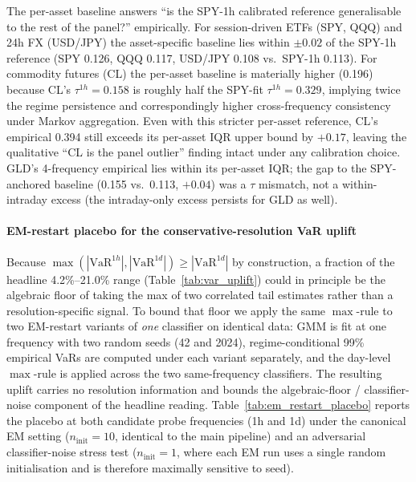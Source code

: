 \documentclass[preprint,12pt,authoryear]{elsarticle}
\begin{document}
\noindent The per-asset baseline answers ``is the SPY-1h calibrated reference generalisable to the rest of the panel?'' empirically. For session-driven ETFs (SPY, QQQ) and 24h FX (USD/JPY) the asset-specific baseline lies within $\pm 0.02$ of the SPY-1h reference (SPY 0.126, QQQ 0.117, USD/JPY 0.108 vs.\ SPY-1h 0.113). For commodity futures (CL) the per-asset baseline is materially higher (0.196) because CL's $\tau^{1h}=0.158$ is roughly half the SPY-fit $\tau^{1h}=0.329$, implying twice the regime persistence and correspondingly higher cross-frequency consistency under Markov aggregation. Even with this stricter per-asset reference, CL's empirical 0.394 still exceeds its per-asset IQR upper bound by $+0.17$, leaving the qualitative ``CL is the panel outlier'' finding intact under any calibration choice. GLD's 4-frequency empirical lies within its per-asset IQR; the gap to the SPY-anchored baseline (0.155 vs.\ 0.113, $+0.04$) was a $\tau$ mismatch, not a within-intraday excess (the intraday-only excess persists for GLD as well).

\paragraph{EM-restart placebo for the conservative-resolution VaR uplift}
\label{app:em_restart_placebo}
Because $\max(|\text{VaR}^{1h}|,|\text{VaR}^{1d}|) \ge |\text{VaR}^{1d}|$ by construction, a fraction of the headline 4.2\%--21.0\% range (Table~\ref{tab:var_uplift}) could in principle be the algebraic floor of taking the max of two correlated tail estimates rather than a resolution-specific signal. To bound that floor we apply the same $\max$-rule to two EM-restart variants of \emph{one} classifier on identical data: GMM is fit at one frequency with two random seeds (42 and 2024), regime-conditional 99\% empirical VaRs are computed under each variant separately, and the day-level $\max$-rule is applied across the two same-frequency classifiers. The resulting uplift carries no resolution information and bounds the algebraic-floor / classifier-noise component of the headline reading. Table~\ref{tab:em_restart_placebo} reports the placebo at both candidate probe frequencies (1h and 1d) under the canonical EM setting ($n_{\text{init}}=10$, identical to the main pipeline) and an adversarial classifier-noise stress test ($n_{\text{init}}=1$, where each EM run uses a single random initialisation and is therefore maximally sensitive to seed).
\end{document}
